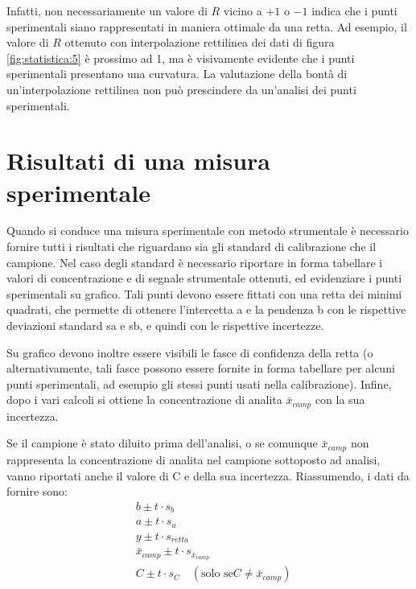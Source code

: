 Infatti, non necessariamente un valore di $R$ vicino a $+1$ o $-1$ indica che i punti sperimentali siano rappresentati in maniera ottimale da una retta. Ad esempio, il valore di $R$ ottenuto con interpolazione rettilinea dei dati di figura \ref{fig:statistica:5} è prossimo ad 1, ma è visivamente evidente che i punti sperimentali presentano una curvatura. La valutazione della bontà di un'interpolazione rettilinea non può prescindere da un'analisi  dei punti sperimentali.


\section{Risultati di una misura sperimentale}

Quando si conduce una misura sperimentale con metodo strumentale è necessario fornire tutti i risultati che riguardano sia gli standard di calibrazione che il campione. Nel caso degli standard è necessario riportare in forma tabellare i valori di concentrazione e di segnale strumentale ottenuti, ed evidenziare i punti sperimentali su grafico. Tali punti devono essere fittati con una retta dei minimi quadrati, che permette di ottenere l'intercetta a e la pendenza b con le rispettive deviazioni standard sa e sb, e quindi con le rispettive incertezze.

Su grafico devono inoltre essere visibili le fasce di confidenza della retta (o alternativamente, tali fasce possono essere fornite in forma tabellare per alcuni punti sperimentali, ad esempio gli stessi punti usati nella calibrazione). Infine, dopo i vari calcoli si ottiene la concentrazione di analita $\bar{x}_{camp}$ con la sua incertezza.

Se il campione è stato diluito prima dell'analisi, o se comunque $\bar{x}_{camp}$ non rappresenta la concentrazione di analita nel campione sottoposto ad analisi, vanno riportati anche il valore di C e della sua incertezza. Riassumendo, i dati da fornire sono:
\begin{align*}
& b \pm t \cdot s_b\\
& a \pm t \cdot s_a\\
& y \pm t \cdot s_{retta}\\
& \bar{x}_{camp} \pm t \cdot s_{\bar{x}_{camp}}\\
& C \pm t \cdot s_C \quad (\text{solo se} C \neq \bar{x}_{camp})\\
\end{align*}

